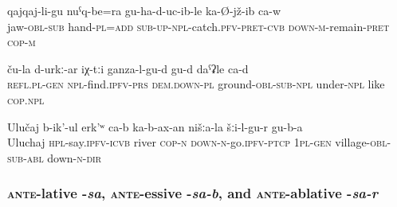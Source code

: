 \begin{exe}	
	\ex	\label{He is sitting with his hands holding his head}
	\gll	qajqaj-li-gu	nuˁq-be=ra	gu-ha-d-uc-ib-le	ka-Ø-jž-ib ca-w\\
		jaw-\textsc{obl}-\textsc{sub}	hand-\textsc{pl}=\textsc{add}	\textsc{sub-up-npl}-catch.\textsc{pfv}-\textsc{pret}-\textsc{cvb}	\textsc{down-m}-remain-\textsc{pret} \textsc{cop-m}\\
	\glt	{}
	
	\ex	\label{Their, these (vegetables) are probably (growing) under the ground}
	\gll	ču-la	d-urkː-ar	iχ-tːi	ganza-l-gu-d	gu-d	daˁʡle	ca-d\\
		\textsc{refl}.\textsc{pl}-\textsc{gen}	\textsc{npl}-find.\textsc{ipfv}-\textsc{prs}	\textsc{dem.down-pl}	ground-\textsc{obl}-\textsc{sub}-\textsc{npl}	under-\textsc{npl}	like	\textsc{cop.npl}\\
	\glt	{}

	
	\ex	\label{The river with the name Uluchaj is passing by down from our village}
	\gll	Ulučaj	b-ik'-ul	erk'ʷ	ca-b	ka-b-ax-an	nišːa-la	šːi-l-gu-r	gu-b-a\\
		Uluchaj	\textsc{hpl}-say.\textsc{ipfv}-\textsc{icvb}	river	\textsc{cop-n}	\textsc{down-n}-go.\textsc{ipfv}-\textsc{ptcp}	1\textsc{pl}-\textsc{gen}	village-\textsc{obl}-\textsc{sub}-\textsc{abl}	down-\textsc{n}-\textsc{dir}\\
	\glt	{}
\end{exe}


\subsubsection{\textsc{ante}-lative -\textit{sa}, \textsc{ante}-essive -\textit{sa-b}, and \textsc{ante}-ablative -\textit{sa-r}}
\label{sssec:ante-lative -sa, ante-essive -sa-b, and ante-ablative -sa-r}

